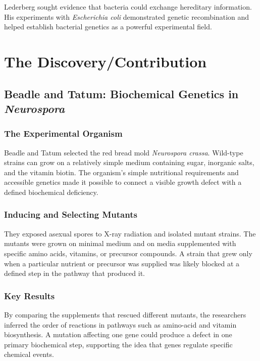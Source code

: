 Lederberg sought evidence that bacteria could exchange hereditary information. His experiments with \textit{Escherichia coli} demonstrated genetic recombination and helped establish bacterial genetics as a powerful experimental field.

\section{The Discovery/Contribution}

\subsection{Beadle and Tatum: Biochemical Genetics in \textit{Neurospora}}

\subsubsection{The Experimental Organism}

Beadle and Tatum selected the red bread mold \textit{Neurospora crassa}. Wild-type strains can grow on a relatively simple medium containing sugar, inorganic salts, and the vitamin biotin. The organism's simple nutritional requirements and accessible genetics made it possible to connect a visible growth defect with a defined biochemical deficiency.

\subsubsection{Inducing and Selecting Mutants}

They exposed asexual spores to X-ray radiation and isolated mutant strains. The mutants were grown on minimal medium and on media supplemented with specific amino acids, vitamins, or precursor compounds. A strain that grew only when a particular nutrient or precursor was supplied was likely blocked at a defined step in the pathway that produced it.

\subsubsection{Key Results}

By comparing the supplements that rescued different mutants, the researchers inferred the order of reactions in pathways such as amino-acid and vitamin biosynthesis. A mutation affecting one gene could produce a defect in one primary biochemical step, supporting the idea that genes regulate specific chemical events.

